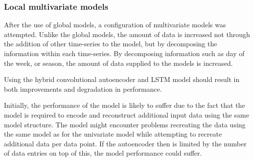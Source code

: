 %
%





\subsubsection{Local multivariate models}

After the use of global models, a configuration of multivariate models was attempted.
Unlike the global models, the amount of data is increased not through the addition of other time-series to the model,
but by decomposing the information within each time-series.
By decomposing information such as day of the week, or season, the amount of data supplied to the models is increased.


Using the hybrid convolutional autoencoder and LSTM model should result in both improvements and degradation in performance.

Initially, the performance of the model is likely to suffer due to the fact that
the model is required to encode and reconstruct additional input data using the same model structure.
The model might encounter problems recreating the data using the same model as for the univariate model
while attempting to recreate additional data per data point.
If the autoencoder then is limited by the number of data entries on top of this, the model performance could suffer.

